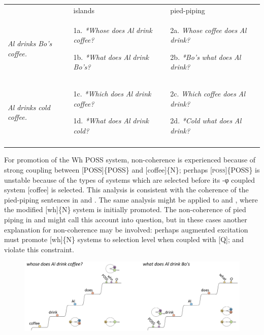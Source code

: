 \begin{tabularx}{\textwidth}{XXX} & islands & pied-piping\\
\lsptoprule
\textit{Al} \textit{drinks} \textit{Bo’s} \textit{coffee.} & 1a.  \textit{*Whose} \textit{does} \textit{Al} \textit{drink} \textit{coffee?}

1b.  \textit{*What} \textit{does} \textit{Al} \textit{drink} \textit{Bo’s?} & 2a.  \textit{Whose} \textit{coffee} \textit{does} \textit{Al} \textit{drink?}

2b.  \textit{*Bo’s} \textit{what} \textit{does} \textit{Al} \textit{drink?}\\
\textit{Al} \textit{drinks} \textit{cold} \textit{coffee.} & 1c.  \textit{*Which} \textit{does} \textit{Al} \textit{drink} \textit{coffee?}

1d.  \textit{*What} \textit{does} \textit{Al} \textit{drink} \textit{cold?} & 2c.  \textit{Which} \textit{coffee} \textit{does} \textit{Al} \textit{drink?}

2d.  \textit{*Cold} \textit{what} \textit{does} \textit{Al} \textit{drink?}\\
\lspbottomrule
\end{tabularx}
  For promotion of the {\textbar}Wh POSS{\textbar} system, non-coherence is experienced because of strong coupling between [POSS]\{POSS\} and [coffee]\{N\}; perhaps [\textsc{poss}]\{POSS\} is unstable because of the types of systems which are selected before its -φ coupled system [coffee] is selected. This analysis is consistent with the coherence of the pied-piping sentences in  and . The same analysis might be applied to  and , where the modified [wh]\{N\} system is initially promoted. The non-coherence of pied piping in  and  might call this account into question, but in these cases another explanation for non-coherence may be involved: perhaps augmented excitation must promote [wh]\{N\} systems to selection level when coupled with [Q];  and  violate this constraint. 

  
\begin{figure}
\includegraphics[width=\textwidth]{figures/Tilsen-img166.png}
\caption{\missingcaption}
\label{fig:}
\end{figure}
 


